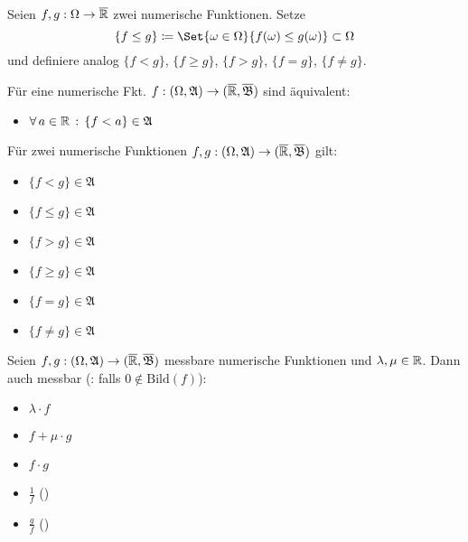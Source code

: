 \documentclass{cheat-sheet}
\newcommand{\Alg}{\mathfrak{A}} %
\newcommand{\Bor}{\mathfrak{B}} %
\begin{document}
\begin{nota}
  Seien $f, g : \Omega \to \overline{\mathbb{R}}$ zwei numerische Funktionen. Setze
    \[ \{ f \leq g \} \coloneqq \Set{ \omega \in \Omega }{ f(\omega) \leq g(\omega) } \subset \Omega \]
  und definiere analog $\{ f < g \}$, $\{ f \geq g \}$, $\{ f > g \}$, $\{ f = g \}$, $\{ f \not= g \}$.
\end{nota}

\begin{satz}
  Für eine numerische Fkt. $f : (\Omega, \Alg) \to (\ER, \overline{\Bor})$ sind äquivalent:
  \begin{itemize}
    \miniitem{0.7 \linewidth}{$\fa{a \in \R} \{ f \geq a \} = f^{-1}([a, \infty]) \in \Alg$}
    \item $\fa{a \in \R} \{ f < a \} \in \Alg$
  \end{itemize}
\end{satz}

\begin{satz}
  Für zwei numerische Funktionen $f, g : (\Omega, \Alg) \to (\ER, \overline{\Bor})$ gilt:
  \begin{multicols}{3}
    \begin{itemize}
      \item $\{ f < g \} \in \Alg$
      \item $\{ f \leq g \} \in \Alg$
      \item $\{ f > g \} \in \Alg$
      \item $\{ f \geq g \} \in \Alg$
      \item $\{ f = g \} \in \Alg$
      \item $\{ f \not= g \} \in \Alg$
    \end{itemize}
  \end{multicols}
\end{satz}

\begin{satz}
  Seien $f, g : (\Omega, \Alg) \to (\ER, \overline{\Bor})$ messbare numerische Funktionen und $\lambda, \mu \in \mathbb{R}$. Dann auch messbar (\ddag: falls $0 \not\in \mathrm{Bild}(f)$):
  \begin{multicols}{5}
    \begin{itemize}
      \item $\lambda \cdot f$
      \item $f + \mu \cdot g$
      \item $f \cdot g$
      \item $\tfrac{1}{f}$ (\ddag)
      \item $\tfrac{g}{f}$ (\ddag)
    \end{itemize}
  \end{multicols}
\end{satz}
\end{document}
